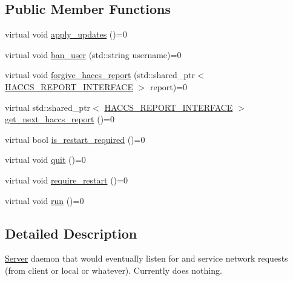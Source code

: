 \subsection*{Public Member Functions}
\begin{DoxyCompactItemize}
\item 
virtual void \hyperlink{classAsteroids_1_1Domain_1_1Server_1_1ServerDaemonInterface_a3ee79b1b6b1e88db05d015969c9fcdc7}{apply\+\_\+updates} ()=0
\item 
virtual void \hyperlink{classAsteroids_1_1Domain_1_1Server_1_1ServerDaemonInterface_a1c2a40f1a8d8f877ca239aaaf5b0a573}{ban\+\_\+user} (std\+::string username)=0
\item 
virtual void \hyperlink{classAsteroids_1_1Domain_1_1Server_1_1ServerDaemonInterface_aae0ae0d5ad7b042a8abddb268072b91e}{forgive\+\_\+haccs\+\_\+report} (std\+::shared\+\_\+ptr$<$ \hyperlink{classAsteroids_1_1Domain_1_1Server_1_1HACCS__REPORT__INTERFACE}{H\+A\+C\+C\+S\+\_\+\+R\+E\+P\+O\+R\+T\+\_\+\+I\+N\+T\+E\+R\+F\+A\+CE} $>$ report)=0
\item 
virtual std\+::shared\+\_\+ptr$<$ \hyperlink{classAsteroids_1_1Domain_1_1Server_1_1HACCS__REPORT__INTERFACE}{H\+A\+C\+C\+S\+\_\+\+R\+E\+P\+O\+R\+T\+\_\+\+I\+N\+T\+E\+R\+F\+A\+CE} $>$ \hyperlink{classAsteroids_1_1Domain_1_1Server_1_1ServerDaemonInterface_a80d5e04ec214d4eb673d2aac1428deca}{get\+\_\+next\+\_\+haccs\+\_\+report} ()=0
\item 
virtual bool \hyperlink{classAsteroids_1_1Domain_1_1Server_1_1ServerDaemonInterface_a6296fbd5a6d327794f7692adf5290d9e}{is\+\_\+restart\+\_\+required} ()=0
\item 
virtual void \hyperlink{classAsteroids_1_1Domain_1_1Server_1_1ServerDaemonInterface_a84b60c3467a1545cb24ec9556ccf707e}{quit} ()=0
\item 
virtual void \hyperlink{classAsteroids_1_1Domain_1_1Server_1_1ServerDaemonInterface_ade086bdbaf264f921653ce56ca31b442}{require\+\_\+restart} ()=0
\item 
virtual void \hyperlink{classAsteroids_1_1Domain_1_1Server_1_1ServerDaemonInterface_aa5e7a6e108e131fc8e99d320b826d0c1}{run} ()=0
\end{DoxyCompactItemize}


\subsection{Detailed Description}
\hyperlink{namespaceAsteroids_1_1Domain_1_1Server}{Server} daemon that would eventually listen for and service network requests (from client or local or whatever). Currently does nothing. 

